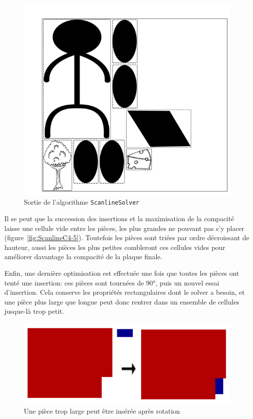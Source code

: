 \begin{figure}[!htb]
\centering
\includegraphics[scale=0.5]{img/ScanlineC6.png}
\caption{Sortie de l'algorithme \texttt{ScanlineSolver}}
\label{fig:ScanlineC6}
\end{figure}

\newpage
\indent Il se peut que la succession des insertions et la maximisation de la compacité laisse une cellule vide entre les pièces, les plus grandes ne pouvant pas s'y placer (figure~\ref{fig:ScanlineC4-5}). Toutefois les pièces sont triées par ordre décroissant de hauteur, aussi les pièces les plus petites combleront ces cellules vides pour améliorer davantage la compacité de la plaque finale.

\newpage
Enfin, une dernière optimisation est effectuée une fois que toutes les pièces ont tenté une insertion: ces pièces sont tournées de 90°, puis un nouvel essai d'insertion. Cela conserve les propriétés rectangulaires dont le solver a besoin, et une pièce plus large que longue peut donc rentrer dans un ensemble de cellules jusque-là trop petit.

\begin{figure}[!htb]
\centering
\includegraphics[scale=0.5]{img/ScanlineClounk.png}
\caption{Une pièce trop large peut être insérée après rotation}
\label{fig:ScanlineClounk}
\end{figure}


